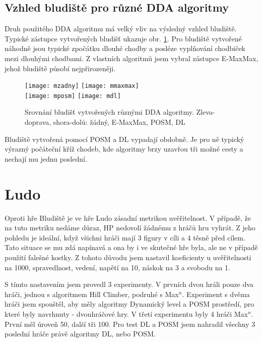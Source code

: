 \subsection{Vzhled bludiště pro různé DDA algoritmy}

Druh použitého DDA algoritmu má velký vliv na výsledný vzhled bludiště. Typické zástupce vytvořených bludišť ukazuje obr. \ref{fig-mazes}. Pro bludiště vytvořené náhodně jsou typické zpočátku dlouhé chodby a posléze vyplňování chodbiček mezi dlouhými chodbami. Z vlastních algoritmů jsem vybral zástupce E-MaxMax, jehož bludiště působí nejpřirozeněji.

\begin{figure}
  \centering
  \texttt{[image: mzadny]}
	\hspace{3pt}
	\texttt{[image: mmaxmax]} \\
	\vspace{6pt}
	\texttt{[image: mposm]}
	\hspace{3pt}
	\texttt{[image: mdl]}
	\caption{Srovnání bludišť vytvořených různými DDA algoritmy. Zleva-doprava, shora-dolů: žádný, E-MaxMax, POSM, DL}
	\label{fig-mazes}
\end{figure}

Bludiště vytvořená pomocí POSM a DL vypadají obdobně. Je pro ně typický výrazný počáteční kříž chodeb, kde algoritmy brzy uzavřou tři možné cesty a nechají mu jednu poslední.

\section{Ludo}

Oproti hře Bludiště je ve hře Ludo zásadní metrikou uvěřitelnost. V případě, že na tuto metriku nedáme důraz, HP nedovolí žádnému z hráčů hru vyhrát. Z jeho pohledu je ideální, když všichni hráči mají 3 figury v cíli a 4 těsně před cílem. Tato situace se mu zdá napínavá a ona by i ve skutečné hře byla, ale ne v případě použití falešné kostky. Z tohoto důvodu jsem nastavil koeficienty u uvěřitelnosti na 1000, spravedlnost, vedení, napětí na 10, náskok na 3 a svobodu na 1.

S tímto nastavením jsem provedl 3 experimenty. V prvních dvou hráli pouze dva hráči, jednou s algoritmem Hill Climber, podruhé s Max$^n$. Experiment s dvěma hráči jsem spouštěl, aby měly algoritmy Dynamický level a POSM prostředí, pro které byly navrhnuty - dvouhráčové hry. V třetí experimentu byly 4 hráči Max$^n$. První měl úroveň 50, další tři 100. Pro test DL a POSM jsem nahradil všechny 3 poslední hráče právě algoritmy DL, nebo POSM.

